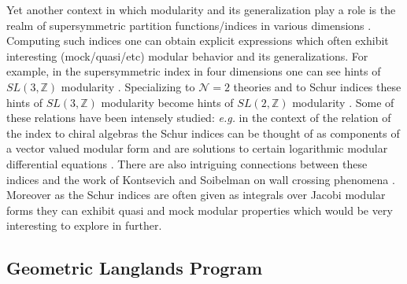 \documentclass[12pt]{article}
\newcommand\CalN{\mathcal{N}}
\begin{document}
Yet another context in which modularity and its generalization play a role is the realm of supersymmetric partition functions/indices in various dimensions \cite{Pestun:2016zxk}. Computing such indices one can obtain explicit expressions which often exhibit interesting (mock/quasi/etc) modular behavior and its generalizations. For example, in
the supersymmetric index in four dimensions \cite{Kinney:2005ej,Romelsberger:2005eg,Dolan:2008qi} one can see hints of $SL(3,{\mathbb{Z}})$ modularity \cite{MR1800253,Spiridonov:2012ww,Gadde:2020bov,Jejjala:2021hlt}. Specializing to ${\CalN}=2$ theories and to Schur indices \cite{Gadde:2011ik,Gadde:2011uv}  these hints of 
$SL(3,{\mathbb{ Z}})$ modularity become hints of $SL(2,{\mathbb{Z}})$ modularity \cite{Razamat:2012uv}. Some of these relations have been intensely studied: {\it e.g.} in the context of the relation of the index to chiral algebras \cite{Beem:2013sza} the Schur indices can be thought of as components of a vector valued modular form and are solutions to certain logarithmic modular differential equations \cite{Beem:2017ooy}. There are also intriguing connections between these indices and the work of Kontsevich and Soibelman on wall crossing phenomena \cite{Cordova:2016uwk,Cordova:2017mhb,Kontsevich:2008fj,Dimofte:2009tm}. Moreover as the Schur indices are often given as integrals over Jacobi modular forms they can exhibit quasi and mock modular properties \cite{Beem:2021zvt,Pan:2021mrw} which would be very interesting to explore in further.

 
\subsection{Geometric Langlands Program}

\label{subsec:GLP}
\end{document}
